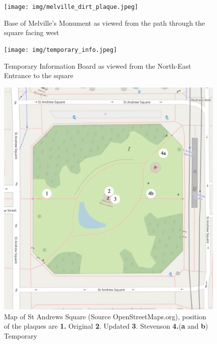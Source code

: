 \documentclass{scrartcl}
\begin{document}
\begin{appendices}
\begin{figure}
    \centering
    \texttt{[image: img/melville\_dirt\_plaque.jpeg]}
    \caption{Base of Melville's Monument as viewed from the path through the square facing  west}
    \label{fig:melville-dirt-plaque}
\end{figure}

\begin{figure}
    \centering
    \texttt{[image: img/temporary\_info.jpeg]}
    \caption{Temporary Information Board as viewed from the North-East Entrance to the square}
    \label{fig:temp-info-square}
\end{figure}


\begin{figure}
    \centering
    \includegraphics[width=1\linewidth]{img/map_numbered.png}
    \caption{Map of St Andrews Square (Source OpenStreetMaps.org), position of the plaques are \textbf{1.} Original \textbf{2}. Updated \textbf{3}. Stevenson \textbf{4.}(\textbf{a} and \textbf{b}) Temporary}
    \label{fig:st_andrews_map}
\end{figure}


\end{appendices}
\end{document}
